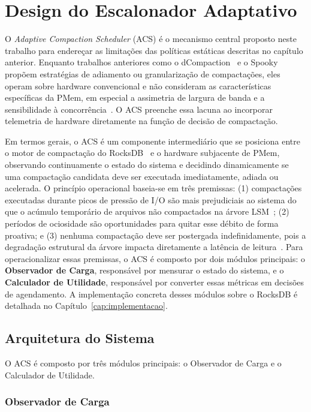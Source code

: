 \chapter{Design do Escalonador Adaptativo}
\label{cap:design}

O \textit{Adaptive Compaction Scheduler} (ACS) é o mecanismo central proposto
neste trabalho para endereçar as limitações das políticas estáticas descritas no
capítulo anterior. Enquanto trabalhos anteriores como o
dCompaction~\cite{dCompaction} e o Spooky~\cite{spooky} propõem estratégias de
adiamento ou granularização de compactações, eles operam sobre hardware
convencional e não consideram as características específicas da PMem, em
especial a assimetria de largura de banda e a sensibilidade à
concorrência~\cite{van_renen_2020}. O ACS preenche essa lacuna ao incorporar
telemetria de hardware diretamente na função de decisão de compactação.

Em termos gerais, o ACS é um componente intermediário que se posiciona entre o
motor de compactação do RocksDB~\cite{rocksdb,rocksdb_wiki} e o hardware
subjacente de PMem, observando continuamente o estado do sistema e decidindo
dinamicamente se uma compactação candidata deve ser executada imediatamente,
adiada ou acelerada. O princípio operacional baseia-se em três premissas: (1)
compactações executadas durante picos de pressão de I/O são mais prejudiciais ao
sistema do que o acúmulo temporário de arquivos não compactados na árvore
LSM~\cite{Sarkar_2021,compaction_policies}; (2) períodos de ociosidade são
oportunidades para quitar esse débito de forma proativa; e (3) nenhuma compactação
deve ser postergada indefinidamente, pois a degradação estrutural da árvore impacta
diretamente a latência de leitura~\cite{Sarkar_2021}. Para operacionalizar essas
premissas, o ACS é composto por dois módulos principais: o \textbf{Observador de
Carga}, responsável por mensurar o estado do sistema, e o \textbf{Calculador de
Utilidade}, responsável por converter essas métricas em decisões de agendamento. A
implementação concreta desses módulos sobre o RocksDB é detalhada no
Capítulo~\ref{cap:implementacao}.


\section{Arquitetura do Sistema}

O ACS é composto por três módulos principais: o Observador de Carga e o Calculador
de Utilidade.

\subsection*{Observador de Carga}

